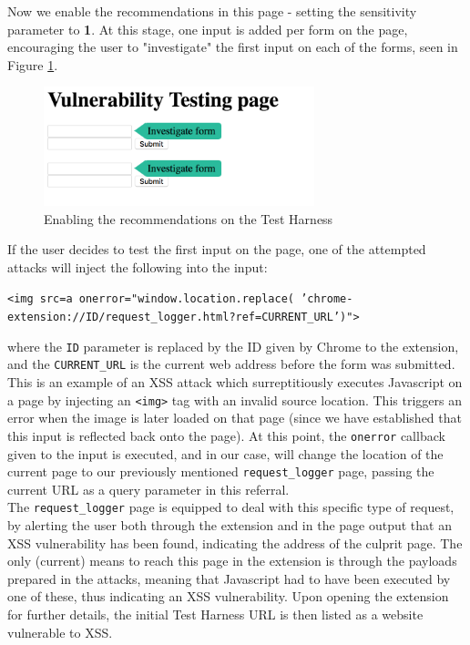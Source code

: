 Now we enable the recommendations in this page - setting the sensitivity parameter to \textbf{1}. At this stage, one input is added per form on the page, encouraging the user to "investigate" the first input on each of the forms, seen in Figure \ref{fig:test_harness_recommendations_2}. 

\begin{figure}[h]
	\centering
	\includegraphics[width=0.7\textwidth]{images/test_harness_recommendations_2.png}
	\caption{Enabling the recommendations on the Test Harness}
	\label{fig:test_harness_recommendations_2}
\end{figure}

If the user decides to test the first input on the page, one of the attempted attacks will inject the following into the input:

\begin{center}
	\texttt{<img src=a onerror="window.location.replace( 'chrome-extension://ID/request\_logger.html?ref=CURRENT\_URL')">}
\end{center}

where the \texttt{ID} parameter is replaced by the ID given by Chrome to the extension, and the \texttt{CURRENT\_URL} is the current web address before the form was submitted. This is an example of an XSS attack which surreptitiously executes Javascript on a page by injecting an \texttt{<img>} tag with an invalid source location. This triggers an error when the image is later loaded on that page (since we have established that this input is reflected back onto the page). At this point, the \texttt{onerror} callback given to the input is executed, and in our case, will change the location of the current page to our previously mentioned \texttt{request\_logger} page, passing the current URL as a query parameter in this referral. \\


The \texttt{request\_logger} page is equipped to deal with this specific type of request, by alerting the user both through the extension and in the page output that an XSS vulnerability has been found, indicating the address of the culprit page. The only (current) means to reach this page in the extension is through the payloads prepared in the attacks, meaning that Javascript had to have been executed by one of these, thus indicating an XSS vulnerability. Upon opening the extension for further details, the initial Test Harness URL is then listed as a website vulnerable to XSS. \\


